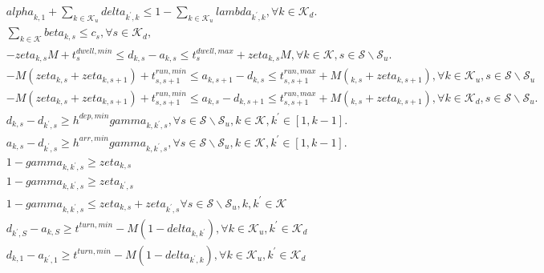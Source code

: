\begin{align}
  & \mathit{alpha}_{k , 1} + \sum_{k \in \mathcal{K}_{u}} \mathit{delta}_{k^{'} , k} \leq 1 - \sum_{k \in \mathcal{K}_{u}} \mathit{lambda}_{k^{'} , k} , \forall k \in \mathcal{K}_{d} . \tag{eq\_0032} \\
  & \sum_{k \in \mathcal{K}} \mathit{beta}_{k , s} \leq c_{s} , \forall s \in \mathcal{K}_{d} , \tag{eq\_0036} \\
  & - \mathit{zeta}_{k , s} M + t_{s}^{dwell,min} \leq d_{k , s} - a_{k , s} \leq t_{s}^{dwell,max} + \mathit{zeta}_{k , s} M , \forall k \in \mathcal{K} , s \in \mathcal{S} \backslash \mathcal{S}_{u} . \tag{eq\_0039} \\
  & - M \left(\mathit{zeta}_{k , s} + \mathit{zeta}_{k , s + 1}\right) + t_{s , s + 1}^{run,min} \leq a_{k , s + 1} - d_{k , s} \leq t_{s , s + 1}^{run , max} + M \left(_{k , s} + \mathit{zeta}_{k , s + 1}\right) , \forall k \in \mathcal{K}_{u} , s \in \mathcal{S} \backslash \mathcal{S}_{u} \tag{eq\_0040\_a} \\
  & - M \left(\mathit{zeta}_{k , s} + \mathit{zeta}_{k , s + 1}\right) + t_{s , s + 1}^{run,min} \leq a_{k , s} - d_{k , s + 1} \leq t_{s , s + 1}^{run , max} + M \left(_{k , s} + \mathit{zeta}_{k , s + 1}\right) , \forall k \in \mathcal{K}_{d} , s \in \mathcal{S} \backslash \mathcal{S}_{u} . \tag{eq\_0040\_b} \\
  & d_{k , s} - d_{k^{'} , s} \geq h^{dep , min} \mathit{gamma}_{k , k^{'} , s} , \forall s \in \mathcal{S} \backslash \mathcal{S}_{u} , k \in \mathcal{K} , k^{'} \in \left[1 , k - 1\right] . \tag{eq\_0041} \\
  & a_{k , s} - d_{k^{'} , s} \geq h^{arr , min} \mathit{gamma}_{k , k^{'} , s} , \forall s \in \mathcal{S} \backslash \mathcal{S}_{u} , k \in \mathcal{K} , k^{'} \in \left[1 , k - 1\right] . \tag{eq\_0043} \\
  & 1 - \mathit{gamma}_{k , k^{'} , s} \geq \mathit{zeta}_{k , s} \tag{eq\_0044\_a} \\
  & 1 - \mathit{gamma}_{k , k^{'} , s} \geq \mathit{zeta}_{k^{'} , s} \tag{eq\_0044\_b} \\
  & 1 - \mathit{gamma}_{k , k^{'} , s} \leq \mathit{zeta}_{k , s} + \mathit{zeta}_{k^{'} , s} \forall s \in \mathcal{S} \backslash \mathcal{S}_{u} , k , k^{'} \in \mathcal{K} \tag{eq\_0044\_c} \\
  & d_{k^{'} , S} - a_{k , S} \geq t^{turn,min} - M \left(1 - \mathit{delta}_{k , k^{'}}\right) , \forall k \in \mathcal{K}_{u} , k^{'} \in \mathcal{K}_{d} \tag{eq\_0045\_a} \\
  & d_{k , 1} - a_{k^{'} , 1} \geq t^{turn,min} - M \left(1 - \mathit{delta}_{k^{'} , k}\right) , \forall k \in \mathcal{K}_{u} , k^{'} \in \mathcal{K}_{d} \tag{eq\_0045\_b} \\

\end{align}
